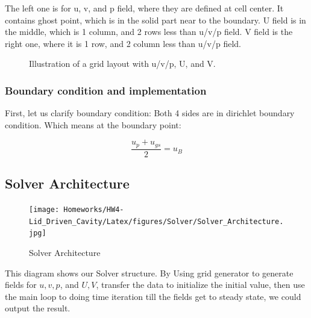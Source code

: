 \documentclass[12pt]{article}
\begin{document}
The left one is for u, v, and p field, where they are defined at cell center. It contains ghost point, which is in the solid part near to the boundary. U field is in the middle, which is 1 column, and 2 rows less than u/v/p field. V field is the right one, where it is 1 row, and 2 column less than u/v/p field.


\begin{figure}[H]
\centering
{}
\caption{Illustration of a grid layout with u/v/p, U, and V.}
\end{figure}


\subsubsection{Boundary condition and implementation}
First, let us clarify boundary condition:
Both 4 sides are in dirichlet boundary condition.
Which means at the boundary point:

$$
\frac{u_{p} + u_{gs}}{2} = u_{B}
$$















\subsection{Solver Architecture}
\begin{figure}[H]
    \centering
    \texttt{[image: Homeworks/HW4-Lid\_Driven\_Cavity/Latex/figures/Solver/Solver\_Architecture.jpg]}
    \caption{Solver Architecture}
\end{figure}


This diagram shows our Solver structure. By Using grid generator to generate fields for $u, v, p$, and $U, V$, transfer the data to initialize the initial value, then use the main loop to doing time iteration till the fields get to steady state, we could output the result. \\
\end{document}
